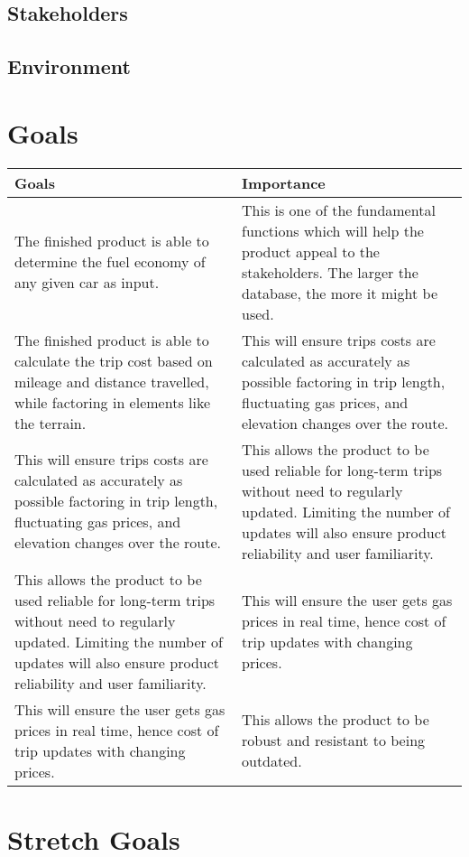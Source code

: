 \documentclass{article}
\begin{document}
\subsection{Stakeholders}

\subsection{Environment}


\section{Goals}
    \begin{tabular}{| p{0.5\linewidth} | p{0.5\linewidth} |}
		\hline
\textbf{Goals} & \textbf{Importance}\\ \hline
The finished product is able to determine the fuel economy of any given car as input. & This is one of the fundamental functions which will help the product appeal to the stakeholders. The larger the database, the more it might be used.\\ \hline
The finished product is able to calculate the trip cost based on mileage and distance travelled, while factoring in elements like the terrain. & This will ensure trips costs are calculated as accurately as possible factoring in trip length, fluctuating gas prices, and elevation changes over the route.\\ \hline 
This will ensure trips costs are calculated as accurately as possible factoring in trip length, fluctuating gas prices, and elevation changes over the route. & This allows the product to be used reliable for long-term trips without need to regularly updated. Limiting the number of updates will also ensure product reliability and user familiarity.\\ \hline 
This allows the product to be used reliable for long-term trips without need to regularly updated. Limiting the number of updates will also ensure product reliability and user familiarity. & This will ensure the user gets gas prices in real time, hence cost of trip updates with changing prices.\\ \hline
This will ensure the user gets gas prices in real time, hence cost of trip updates with changing prices. & This allows the product to be robust and resistant to being outdated. \\ \hline  
    \end{tabular}

\section{Stretch Goals}
\end{document}
